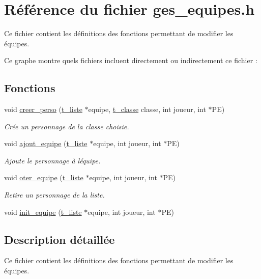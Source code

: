 \hypertarget{a00018}{}\section{Référence du fichier ges\+\_\+equipes.\+h}
\label{a00018}


Ce fichier contient les définitions des fonctions permettant de modifier les équipes.  


Ce graphe montre quels fichiers incluent directement ou indirectement ce fichier \+:
\subsection*{Fonctions}
\begin{DoxyCompactItemize}
\item 
void \hyperlink{a00018_a81881c560de70e7f41649ddefb5efd12}{creer\+\_\+perso} (\hyperlink{a00006}{t\+\_\+liste} $\ast$equipe, \hyperlink{a00004}{t\+\_\+classe} classe, int joueur, int $\ast$PE)
\begin{DoxyCompactList}\small\item\em Crée un personnage de la classe choisie. \end{DoxyCompactList}\item 
void \hyperlink{a00018_a994d5645dd5285703f220c21eb38c849}{ajout\+\_\+equipe} (\hyperlink{a00006}{t\+\_\+liste} $\ast$equipe, int joueur, int $\ast$PE)
\begin{DoxyCompactList}\small\item\em Ajoute le personnage à l\textquotesingle{}équipe. \end{DoxyCompactList}\item 
void \hyperlink{a00018_a3fc9764c1f5a4c86bc574439f9092689}{oter\+\_\+equipe} (\hyperlink{a00006}{t\+\_\+liste} $\ast$equipe, int joueur, int $\ast$PE)
\begin{DoxyCompactList}\small\item\em Retire un personnage de la liste. \end{DoxyCompactList}\item 
void \hyperlink{a00018_a13288c98091fa36fe74b412dee64918f}{init\+\_\+equipe} (\hyperlink{a00006}{t\+\_\+liste} $\ast$equipe, int joueur, int $\ast$PE)
\end{DoxyCompactItemize}


\subsection{Description détaillée}
Ce fichier contient les définitions des fonctions permettant de modifier les équipes. 

